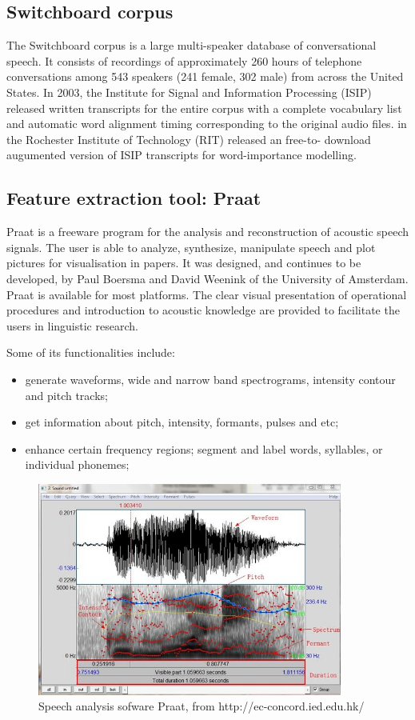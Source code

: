 \subsection{Switchboard corpus}
The Switchboard corpus is a large multi-speaker database of conversational speech. It consists of recordings of approximately 260 hours of telephone conversations among 543 speakers (241 female, 302 male) from across the United States. In 2003, the Institute for Signal and Information Processing (ISIP) released written transcripts for the entire corpus with a complete vocabulary list and automatic word alignment timing corresponding to the original audio files. \citet{Kafle2018} in the Rochester Institute of Technology (RIT) released an free-to- download augumented version of ISIP transcripts for word-importance modelling. 

\subsection{Feature extraction tool: Praat}
Praat \citep{PaulBoersma&DavidWeenink2018} is a freeware program for the analysis and reconstruction of acoustic speech signals. The user is able to analyze, synthesize, manipulate speech and plot pictures for visualisation in papers. It was designed, and continues to be developed, by Paul Boersma and David Weenink of the University of Amsterdam. Praat is available for most platforms. The clear visual presentation of operational procedures and introduction to acoustic knowledge are provided to facilitate the users in linguistic research.

Some of its functionalities include:
\begin{itemize}
    \item generate waveforms, wide and narrow band spectrograms, intensity contour and pitch tracks;
    \item get information about pitch, intensity, formants, pulses and etc;
    \item enhance certain frequency regions; segment and label words, syllables, or individual phonemes;
\end{itemize}

\begin{figure}[ht]
\center
\includegraphics[width=10cm, scale=0.7]{figures/Praat.jpg}
\caption{Speech analysis sofware Praat, from http://ec-concord.ied.edu.hk/}
\label{fig:praat}
\end{figure}


